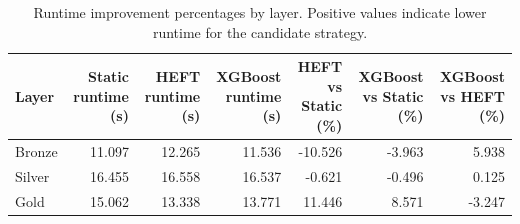\begin{table}
\caption{Runtime improvement percentages by layer. Positive values indicate lower runtime for the candidate strategy.}
\label{tab:runtime-improvement}
\begin{tabular}{lrrrrrr}
\toprule
Layer & Static runtime (s) & HEFT runtime (s) & XGBoost runtime (s) & HEFT vs Static (\%) & XGBoost vs Static (\%) & XGBoost vs HEFT (\%) \\
\midrule
Bronze & 11.097 & 12.265 & 11.536 & -10.526 & -3.963 & 5.938 \\
Silver & 16.455 & 16.558 & 16.537 & -0.621 & -0.496 & 0.125 \\
Gold & 15.062 & 13.338 & 13.771 & 11.446 & 8.571 & -3.247 \\
\bottomrule
\end{tabular}
\end{table}

